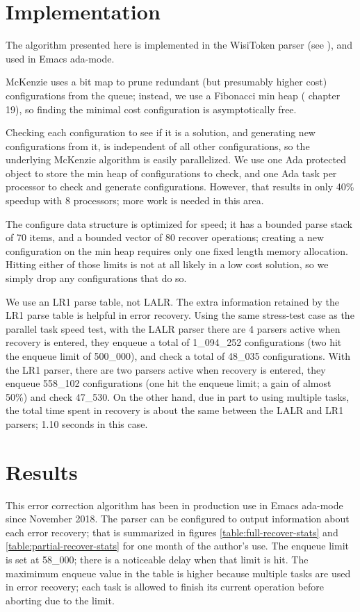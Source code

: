 \documentclass{article}
\begin{document}
\section{Implementation}
The algorithm presented here is implemented in the WisiToken parser
(see \cite{wisitoken}), and used in Emacs ada-mode.

McKenzie uses a bit map to prune redundant (but presumably higher
cost) configurations from the queue; instead, we use a Fibonacci min
heap (\cite{algorithms 2009} chapter 19), so finding the minimal cost
configuration is asymptotically free.

Checking each configuration to see if it is a solution, and generating
new configurations from it, is independent of all other
configurations, so the underlying McKenzie algorithm is easily
parallelized. We use one Ada protected object to store the min heap of
configurations to check, and one Ada task per processor to check and
generate configurations. However, that results in only 40\% speedup
with 8 processors; more work is needed in this area.

The configure data structure is optimized for speed; it has a bounded
parse stack of 70 items, and a bounded vector of 80 recover
operations; creating a new configuration on the min heap requires only
one fixed length memory allocation. Hitting either of those limits is
not at all likely in a low cost solution, so we simply drop any
configurations that do so.

We use an LR1 parse table, not LALR. The extra information retained by
the LR1 parse table is helpful in error recovery. Using the same
stress-test case as the parallel task speed test, with the LALR parser
there are 4 parsers active when recovery is entered, they enqueue a
total of 1\_094\_252 configurations (two hit the enqueue limit of
500\_000), and check a total of 48\_035 configurations. With the LR1
parser, there are two parsers active when recovery is entered, they
enqueue 558\_102 configurations (one hit the enqueue limit; a gain of
almost 50\%) and check 47\_530. On the other hand, due in part to
using multiple tasks, the total time spent in recovery is about the
same between the LALR and LR1 parsers; 1.10 seconds in this case.

\section{Results}
This error correction algorithm has been in production use in Emacs
ada-mode since November 2018. The parser can be configured to output
information about each error recovery; that is summarized in figures
\ref{table:full-recover-stats} and \ref{table:partial-recover-stats} for
one month of the author's use. The enqueue limit is set at 58\_000;
there is a noticeable delay when that limit is hit. The maximimum
enqueue value in the table is higher because multiple tasks are used
in error recovery; each task is allowed to finish its current
operation before aborting due to the limit.
\end{document}
